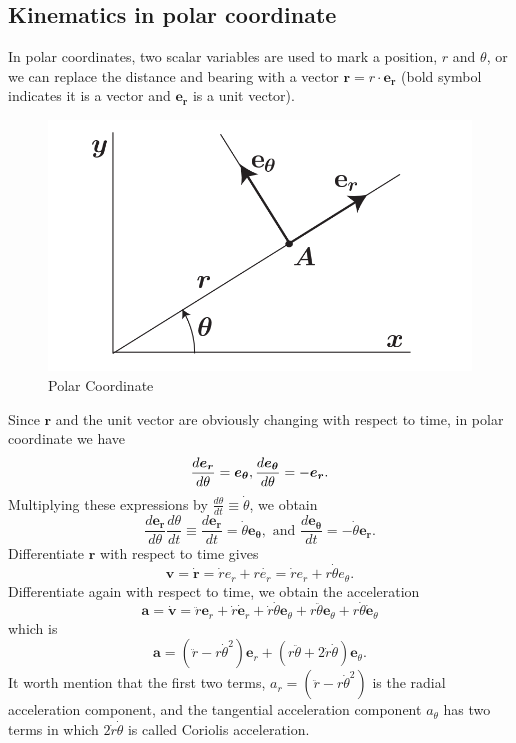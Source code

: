\documentclass{article}
\begin{document}
\subsection{Kinematics in polar coordinate}
In polar coordinates, two scalar variables are used to mark a position, $r$ and $\theta$, or we can replace the distance and bearing with a vector $\boldsymbol{r} = r\cdot \boldsymbol{e_r}$ (bold symbol indicates it is a vector and $\boldsymbol{e_r}$ is a unit vector).
\begin{figure}
    \centering
    \includegraphics[width=0.5\linewidth]{images/polar_coordinate.png}
    \caption{Polar Coordinate\autocite{Widnall2008}}
    \label{fig:PolarCoor}
\end{figure}
Since $\boldsymbol{r}$ and the unit vector are obviously changing with respect to time, in polar coordinate we have 
\[\frac{d\boldsymbol{e_r}}{d\theta} = \boldsymbol{e_\theta}, \space \frac{d\boldsymbol{e_\theta}}{d\theta} = -\boldsymbol{e_r}.\]
Multiplying these expressions by $\frac{d\theta}{dt} \equiv \dot\theta$,  we obtain
\[\frac{d \boldsymbol{e_r}}{d \theta} \frac{d \theta}{d t} \equiv \frac{d \boldsymbol{e_r}}{d t}=\dot{\theta} \boldsymbol{e_\theta}, \text { and }  \frac{d \boldsymbol{e_\theta}}{d t}=-\dot{\theta} \boldsymbol{e_r}.\]
Differentiate $\boldsymbol{r}$ with respect to time gives
\[\boldsymbol{v} = \dot{\boldsymbol{r}} = \dot{r} e_r + r\dot{e_r} = \dot{r} e_r + r \dot\theta e_\theta.\]
Differentiate again with respect to time, we obtain the acceleration
$$
\boldsymbol{a}=\dot{\boldsymbol{v}}=\ddot{r} \boldsymbol{e}_{r}+\dot{r} \dot{\boldsymbol{e}}_{r}+\dot{r} \dot{\theta} \boldsymbol{e}_{\theta}+r \ddot{\theta} \boldsymbol{e}_{\theta}+r \dot{\theta} \dot{\boldsymbol{e}}_{\theta}
$$
which is
$$
\boldsymbol{a}=(\ddot{r}-r \dot{\theta}^{2}) \boldsymbol{e}_{r}+(r \ddot{\theta}+2 \dot{r} \dot{\theta}) \boldsymbol{e}_{\theta}.
$$
It worth mention that the first two terms, $a_{r}=\left(\ddot{r}-r \dot{\theta}^{2}\right)$ is the radial acceleration component, and the tangential acceleration component $a_{\theta}$ has two terms in which $2 \dot{r} \dot{\theta}$ is called Coriolis acceleration. 
\end{document}
